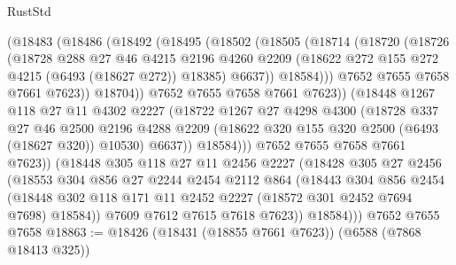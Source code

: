 \begin{lexlean}{RustStd}
\begin{coremodule}
                  (@18483
                    (@18486
                      (@18492
                        (@18495
                          (@18502
                            (@18505
                              (@18714
                                (@18720
                                  (@18726
                                    (@18728
                                      @288
                                      @27
                                      @46
                                      @4215
                                      @2196
                                      @4260
                                      @2209
                                      (@18622 @272 @155 @272 @4215 (@6493 (@18627 @272)) @18385)
                                      @6637))
                                  @18584)))
                            @7652
                            @7655
                            @7658
                            @7661
                            @7623))
                        @18704))
                    @7652
                    @7655
                    @7658
                    @7661
                    @7623))
                (@18448
                  @1267
                  @118
                  @27
                  @11
                  @4302
                  @2227
                  (@18722
                    @1267
                    @27
                    @4298
                    @4300
                    (@18728
                      @337
                      @27
                      @46
                      @2500
                      @2196
                      @4288
                      @2209
                      (@18622 @320 @155 @320 @2500 (@6493 (@18627 @320)) @10530)
                      @6637))
                  @18584)))
            @7652
            @7655
            @7658
            @7661
            @7623))
        (@18448
          @305
          @118
          @27
          @11
          @2456
          @2227
          (@18428
            @305
            @27
            @2456
            (@18553
              @304
              @856
              @27
              @2244
              @2454
              @2112
              @864
              (@18443
                @304
                @856
                @2454
                (@18448 @302 @118 @171 @11 @2452 @2227 (@18572 @301 @2452 @7694 @7698) @18584))
              @7609
              @7612
              @7615
              @7618
              @7623))
          @18584)))
    @7652
    @7655
    @7658
@18863 := @18426 (@18431 (@18855 @7661 @7623)) (@6588 (@7868 @18413 @325))

\end{coremodule}
\end{lexlean}
